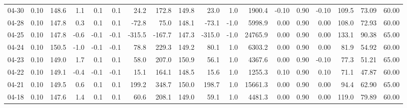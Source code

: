 \begin{threeparttable}
{\begin{tabular}{lrrrrrrrrrrrrrrrrr}
  04-30 &     0.10 & 148.6 &               1.1 &               0.1 &                0.1 &               24.2 &  172.8 & 149.8 &       23.0 &                      1.0 &              1900.4 &      -0.10 &      0.90 &          -0.10 &            109.5 &           73.09 &                  60.00 \\
  04-28 &     0.10 & 147.8 &               0.3 &               0.1 &                0.1 &              -72.8 &   75.0 & 148.1 &      -73.1 &                     -1.0 &              5998.9 &       0.00 &      0.90 &           0.00 &            108.0 &           72.93 &                  60.00 \\
  04-25 &     0.10 & 147.8 &              -0.6 &              -0.1 &               -0.1 &             -315.5 & -167.7 & 147.3 &     -315.0 &                     -1.0 &             24765.9 &       0.00 &      0.90 &           0.00 &            133.1 &           90.38 &                  65.00 \\
  04-24 &     0.10 & 150.5 &              -1.0 &              -0.1 &               -0.1 &               78.8 &  229.3 & 149.2 &       80.1 &                      1.0 &              6303.2 &       0.00 &      0.90 &           0.00 &             81.9 &           54.92 &                  60.00 \\
  04-23 &     0.10 & 149.0 &               1.7 &               0.1 &                0.1 &               58.0 &  207.0 & 150.9 &       56.1 &                      1.0 &              4367.6 &       0.00 &      0.90 &          -0.10 &             77.3 &           51.21 &                  65.00 \\
  04-22 &     0.10 & 149.1 &              -0.4 &              -0.1 &               -0.1 &               15.1 &  164.1 & 148.5 &       15.6 &                      1.0 &              1255.3 &       0.10 &      0.90 &           0.10 &             71.1 &           47.87 &                  60.00 \\
  04-21 &     0.10 & 149.5 &               0.6 &               0.1 &                0.1 &              199.2 &  348.7 & 150.0 &      198.7 &                      1.0 &             15661.3 &       0.00 &      0.90 &           0.00 &             94.4 &           62.90 &                  65.00 \\
  04-18 &     0.10 & 147.6 &               1.4 &               0.1 &                0.1 &               60.6 &  208.1 & 149.0 &       59.1 &                      1.0 &              4481.3 &       0.00 &      0.90 &           0.00 &            119.0 &           79.89 &                  60.00 \\

\end{tabular}}
\end{threeparttable}
